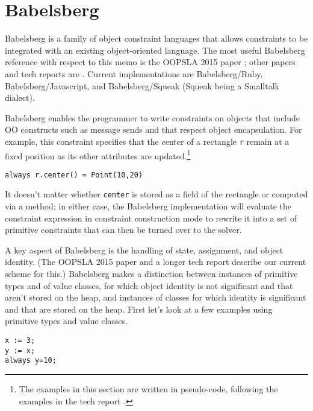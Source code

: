 \documentclass{article}
\begin{document}
\section{Babelsberg}
\label{sec:babelsberg}

Babelsberg is a family of object constraint languages that allows
constraints to be integrated with an existing object-oriented
language.  The most useful Babelsberg reference with respect to this
memo is the OOPSLA 2015 paper \cite{felgentreff-oopsla-2015}; other
papers and tech reports are
\cite{FelgentreffJOT14,felgentreff-ecoop-2014,
  felgentreff-step-by-step-tr}.  Current implementations are
Babelsberg/Ruby, Babelsberg/Javascript, and Babelsberg/Squeak (Squeak
being a Smalltalk dialect).

Babelsberg enables the programmer to write constraints on objects that
include OO constructs such as message sends and that respect object
encapsulation.  For example, this constraint specifies that the center
of a rectangle \verb|r| remain at a fixed position as its other
attributes are updated.\footnote{The examples in this section are
  written in pseudo-code, following the examples in the tech report
  \cite{felgentreff-step-by-step-tr}.}

\begin{verbatim}
always r.center() = Point(10,20)
\end{verbatim}

It doesn't matter whether \verb|center| is stored as a field of the
rectangle or computed via a method; in either case, the Babelsberg
implementation will evaluate the constraint expression in constraint
construction mode to rewrite it into a set of primitive constraints
that can then be turned over to the solver.

A key aspect of Babelsberg is the handling of state, assignment, and
object identity.  (The OOPSLA 2015 paper
\cite{felgentreff-oopsla-2015} and a longer tech report
\cite{felgentreff-step-by-step-tr} describe our current scheme for
this.)  Babelsberg makes a distinction between instances of primitive
types and of value classes, for which object identity is not
significant and that aren't stored on the heap, and instances of
classes for which identity is significant and that are stored on the
heap.  First let's look at a few examples using primitive types and
value classes.

\begin{verbatim}
x := 3;
y := x;
always y=10;
\end{verbatim}
\end{document}
